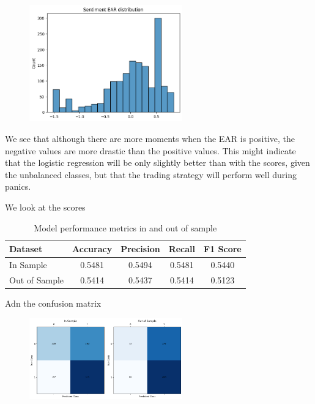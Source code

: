 \documentclass[
  a4paper]{article}
\begin{document}
\begin{figure}

{\centering \includegraphics[width=2.60417in,height=\textheight]{graphs/ear_distrib.png}

}

\end{figure}

We see that although there are more moments when the EAR is positive,
the negative values are more drastic than the positive values. This
might indicate that the logistic regression will be only slightly better
than with the scores, given the unbalanced classes, but that the trading
strategy will perform well during panics.

We look at the scores

\begin{table}[h]
\centering
\begin{tabular}{|l|c|c|c|c|}
\hline
\textbf{Dataset} & \textbf{Accuracy} & \textbf{Precision} & \textbf{Recall} & \textbf{F1 Score} \\
\hline
In Sample & 0.5481 & 0.5494 & 0.5481 & 0.5440 \\
Out of Sample & 0.5414 & 0.5437 & 0.5414 & 0.5123 \\
\hline
\end{tabular}
\caption{Model performance metrics in and out of sample}

\end{table}

Adn the confusion matrix

\begin{figure}

{\centering \includegraphics[width=2.60417in,height=\textheight]{graphs/ear_cm.png}

}

\end{figure}
\end{document}
